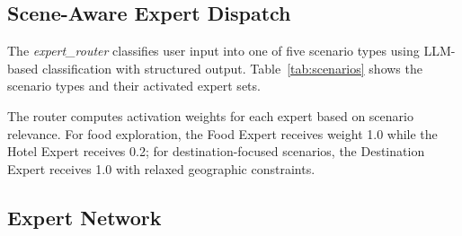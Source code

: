 \subsection{Scene-Aware Expert Dispatch}

The \textit{expert\_router} classifies user input into one of five scenario types using LLM-based classification with structured output. Table~\ref{tab:scenarios} shows the scenario types and their activated expert sets.

\begin{table}[!t]
\centering
\caption{Scenario types and their activated expert sets.}
\label{tab:scenarios}
\end{table}

The router computes activation weights for each expert based on scenario relevance. For food exploration, the Food Expert receives weight 1.0 while the Hotel Expert receives 0.2; for destination-focused scenarios, the Destination Expert receives 1.0 with relaxed geographic constraints.

\subsection{Expert Network}


